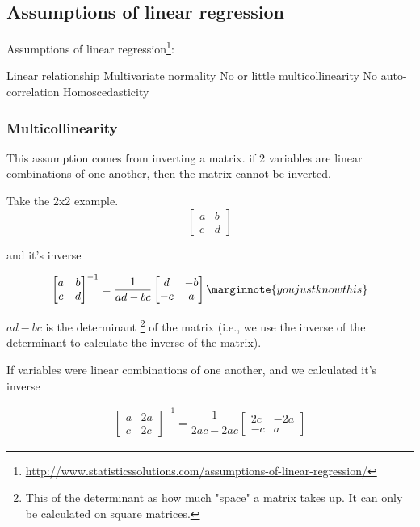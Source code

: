 \documentclass[10pt,letterpaper,twoside]{article}
\begin{document}
\subsection{Assumptions of linear regression}

Assumptions of linear regression\footnote{\url{http://www.statisticssolutions.com/assumptions-of-linear-regression/}}:

Linear relationship
Multivariate normality
No or little multicollinearity
No auto-correlation
Homoscedasticity


\subsubsection{Multicollinearity}

This assumption comes from inverting a matrix.
if 2 variables are linear combinations of one another, then the matrix cannot be inverted.

Take the 2x2 example.
\[
\begin{bmatrix}
    a & b \\
    c & d
\end{bmatrix}
\]

and it's inverse

\begin{align}
    \begin{bmatrix}
    a & b \\
    c & d
    \end{bmatrix}^{-1}
    =
    \dfrac{1}{ad - bc}
    \begin{bmatrix}
    d & -b \\
    -c & a
    \end{bmatrix}    \marginnote{you just know this}
\end{align}

$ad - bc$ is the determinant
\footnote{This of the determinant as how much "space" a matrix takes up.
    It can only be calculated on square matrices.}
of the matrix
(i.e., we use the inverse of the determinant to calculate the inverse of the matrix).

If variables were linear combinations of one another, and we calculated it's inverse

\begin{align}
    \begin{bmatrix}
    a & 2a \\
    c & 2c
    \end{bmatrix}^{-1}
    =
    \dfrac{1}{2ac - 2ac}
    \begin{bmatrix}
    2c & -2a \\
    -c & a
    \end{bmatrix}
\end{align}
\end{document}
